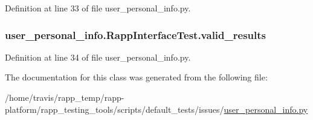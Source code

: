 Definition at line 33 of file user\-\_\-personal\-\_\-info.\-py.

\hypertarget{classuser__personal__info_1_1RappInterfaceTest_a5f0ab4a003be1b71e1606a35ad25cad7}{
\subsubsection[{valid\-\_\-results}]{\setlength{\rightskip}{0pt plus 5cm}user\-\_\-personal\-\_\-info.\-Rapp\-Interface\-Test.\-valid\-\_\-results}}\label{classuser__personal__info_1_1RappInterfaceTest_a5f0ab4a003be1b71e1606a35ad25cad7}


Definition at line 34 of file user\-\_\-personal\-\_\-info.\-py.



The documentation for this class was generated from the following file\-:\begin{DoxyCompactItemize}
\item 
/home/travis/rapp\-\_\-temp/rapp-\/platform/rapp\-\_\-testing\-\_\-tools/scripts/default\-\_\-tests/issues/\hyperlink{user__personal__info_8py}{user\-\_\-personal\-\_\-info.\-py}\end{DoxyCompactItemize}
